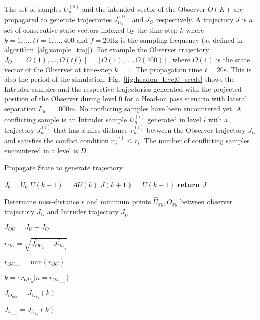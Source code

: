 \documentclass[journal]{IEEEtran}
\begin{document}
The set of samples $U_{n}^{(0)}$ and the intended vector of the Observer $O(K)$ are propagated to generate trajectories $J_{U_{n}}^{(0)}$ and $J_{O}$ respectively. A trajectory $J$ is a set of consecutive state vectors indexed by the time-step $k$ where $k = 1,...,tf = 1,...,400$ and $f = 20\text{Hz}$ is the sampling frequency (as defined in algorithm~\ref{alg:sample_traj}). For example the Observer trajectory $J_{O} = [O(1),...,O(tf)] = [O(1),...,O(400)]$, where $O(1)$ is the state vector of the Observer at time-step $k = 1$. The propagation time $t = 20\text{s}$. This is also the period of the simulation. Fig.~\ref{fig:headon_level0_seeds} shows the Intruder samples and the respective trajectories generated with the projected position of the Observer during level 0 for a Head-on pass scenario with lateral separation $L_{a} = 1000\text{m}$. No conflicting samples have been encountered yet. A conflicting sample is an Intruder sample $U_{n}^{(i)}$ generated in level $i$ with a trajectory $J_{n}^{(i)}$ that has a miss-distance $r_{n}^{(i)}$ between the Observer trajectory $J_{O}$ and satisfies the conflict condition $r_{n}^{(i)} \leq r_{t}$. The number of conflicting samples encountered in a level is $D$.



\begin{algorithm}[!t]
\caption{Propagate State to generate trajectory}
\label{alg:sample_traj}
	\begin{algorithmic}[1]
			\State $J_{0} = U_{0}$
					\State $U(k+1) = AU(k)$
					\State $J(k+1) = U(k+1)$
				\EndFor
				\State \textbf{return $J$}
			\EndFunction
	\end{algorithmic}
\end{algorithm}

\begin{algorithm}[!t]
\caption{Determine miss-distance $r$ and minimum points $\hat{U}_{xy}, O_{xy}$ between observer trajectory $J_{O}$ and Intruder trajectory $J_{\hat{U}}$}
\label{alg:miss_distance}
	\begin{algorithmic}[1]
		
		\State $J_{OU} = J_{U} - J_{O}$
		
		\State $r_{OU} = \sqrt{J_{OU_{x}}^{2} + J_{OU_{y}}^{2}}$		

		\State $r_{OU_{\text{min}}} = \text{min}(r_{OU})$
		
		\State $k = \{r_{OU_{n}}|n = r_{OU_{\text{min}}}\}$

\State $J_{O_{\text{min}}} = J_{O_{xy}}(k)$

\State $J_{U_{\text{min}}} = J_{U_{xy}}(k)$
		
		\EndFunction
	\end{algorithmic}
\end{algorithm}
\end{document}

